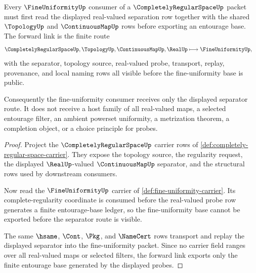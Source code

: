 \begin{theorem}
\label{thm:completely-regular-space-fine-uniformity-forward-link}
Every $\FineUniformityUp$ consumer of a $\CompletelyRegularSpaceUp$ packet must first read the displayed real-valued separation row together with the shared $\TopologyUp$ and $\ContinuousMapUp$ rows before exporting an entourage base. The forward link is the finite route
$$
\CompletelyRegularSpaceUp,\TopologyUp,\ContinuousMapUp,\RealUp
\longmapsto
\FineUniformityUp ,
$$
with the separator, topology source, real-valued probe, transport, replay, provenance, and local naming rows all visible before the fine-uniformity base is public.

Consequently the fine-uniformity consumer receives only the displayed separator route. It does not receive a host family of all real-valued maps, a selected entourage filter, an ambient powerset uniformity, a metrization theorem, a completion object, or a choice principle for probes.
\end{theorem}
\begin{proof}
Project the $\CompletelyRegularSpaceUp$ carrier rows of \autoref{def:completely-regular-space-carrier}. They expose the topology source, the regularity request, the displayed $\RealUp$-valued $\ContinuousMapUp$ separator, and the structural rows used by downstream consumers.

Now read the $\FineUniformityUp$ carrier of \autoref{def:fine-uniformity-carrier}. Its complete-regularity coordinate is consumed before the real-valued probe row generates a finite entourage-base ledger, so the fine-uniformity base cannot be exported before the separator route is visible.

The same $\hsame$, $\Cont$, $\Pkg$, and $\NameCert$ rows transport and replay the displayed separator into the fine-uniformity packet. Since no carrier field ranges over all real-valued maps or selected filters, the forward link exports only the finite entourage base generated by the displayed probes.
\end{proof}
